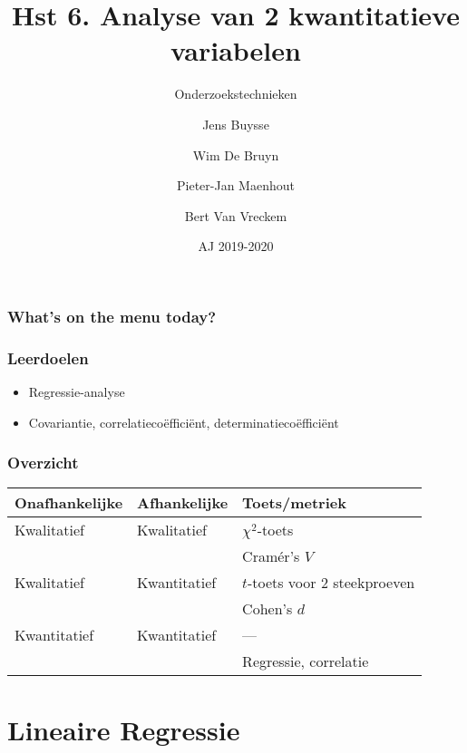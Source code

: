 \documentclass[aspectratio=169]{beamer}
\title{Hst 6. Analyse van 2 kwantitatieve variabelen}
\subtitle{Onderzoekstechnieken}
\author{Jens Buysse \and Wim {De Bruyn} \and Pieter-Jan Maenhout \and Bert {Van Vreckem}}
\date{AJ 2019-2020}
\begin{document}
\begin{frame}
  \maketitle
\end{frame}

\begin{frame}
  \frametitle{What's on the menu today?}
  
  \tableofcontents
\end{frame}

\begin{frame}
  \frametitle{Leerdoelen}
  
  \begin{itemize}
    \item Regressie-analyse
    \item Covariantie, correlatiecoëfficiënt, determinatiecoëfficiënt
  \end{itemize}
\end{frame}

\begin{frame}
  \frametitle{Overzicht}
    \centering
    \begin{tabular}{lll}
    	\toprule
    	\textbf{Onafhankelijke} & \textbf{Afhankelijke} & \textbf{Toets/metriek}        \\
    	\midrule
    	Kwalitatief             & Kwalitatief           & $\chi^2$-toets                \\
    	                        &                       & Cramér's $V$                  \\
    	Kwalitatief             & Kwantitatief          & $t$-toets voor 2 steekproeven \\
    	                        &                       & Cohen's $d$                   \\
    	Kwantitatief            & Kwantitatief          & ---                           \\
    	                        &                       & Regressie, correlatie         \\
    	\bottomrule
    \end{tabular}
\end{frame}

\section{Lineaire Regressie}
\end{document}
